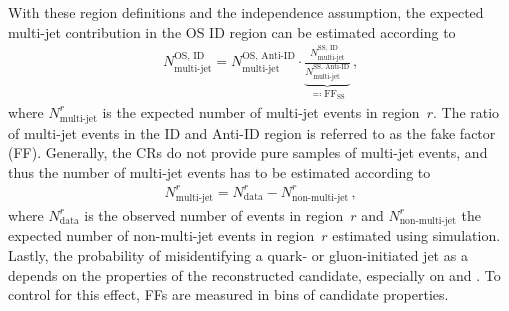With these region definitions and the independence assumption, the expected
multi-jet contribution in the OS ID region can be estimated according to
\begin{align*}
  N_\text{multi-jet}^{\text{OS, ID}} =
  N_\text{multi-jet}^{\text{OS, Anti-ID}}
  \cdot
  \underbrace{\frac{N_\text{multi-jet}^{\text{SS, ID}}}
  {N_\text{multi-jet}^{\text{SS, Anti-ID}}}}
  _{\eqqcolon \text{FF}_{\text{SS}}} \,\text{,}
\end{align*}
where $N_\text{multi-jet}^{r}$ is the expected number of multi-jet events in
region~$r$. The ratio of multi-jet events in the ID and Anti-ID region is
referred to as the fake factor (FF).
Generally, the CRs do not provide pure samples of multi-jet events, and thus the
number of multi-jet events has to be estimated according to
\begin{align*}
  N_\text{multi-jet}^{r} = N_\text{data}^{r} - N_\text{non-multi-jet}^{r} \,\text{,}
\end{align*}
where $N_\text{data}^{r}$ is the observed number of events in region~$r$ and
$N_\text{non-multi-jet}^{r}$ the expected number of non-multi-jet events in
region~$r$ estimated using simulation. Lastly, the probability of misidentifying
a quark- or gluon-initiated jet as a \tauhadvis depends on the properties of the
reconstructed \tauhadvis candidate, especially on \Ntracks and \pT. To control
for this effect, FFs are measured in bins of \tauhadvis candidate properties.


